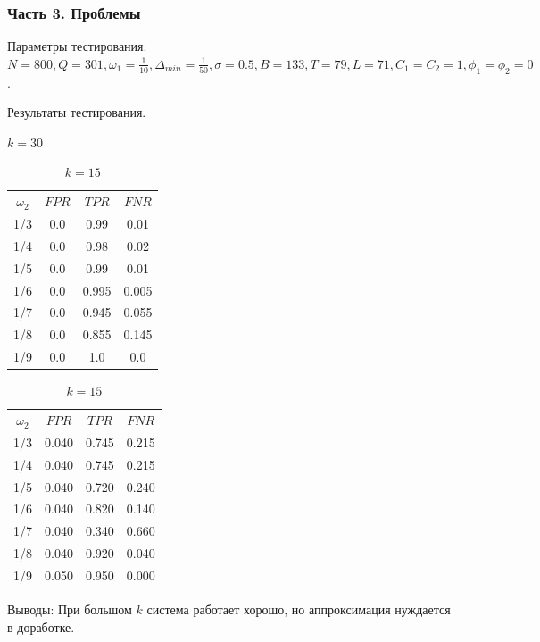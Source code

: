 \documentclass[pdf, 9pt,intlimits, unicode]{beamer}
\begin{document}
	\begin{frame}
		\frametitle{Часть 3. Проблемы}
		{\color{blue} Параметры тестирования:} $ N = 800, Q=301, \omega_1=\frac{1}{10} , \Delta_{min}=\frac{1}{50}, \sigma=0.5, B=133, T=79, L=71, C_1=C_2=1, \phi_1=\phi_2=0$.
		
		\bigskip
		
		\begin{table}[!hhh]
			\center
			\caption{Результаты тестирования.}
			\begin{minipage}{.5\linewidth}
				\caption{$ k=30 $}
				\centering
				\begin{tabular}{cccc}
					\toprule
					$ \omega_2 $ & $ FPR $ &    $ TPR $ &    $ FNR $ \\
					1/3 &  0.0 &   0.99 &   0.01 \\
					1/4 &  0.0 &   0.98 &   0.02 \\
					1/5 &  0.0 &   0.99 &   0.01 \\
					1/6 &  0.0 &  0.995 &  0.005 \\				
					1/7 &  0.0 &  0.945 &  0.055 \\
					1/8 &  0.0 &  0.855 &  0.145 \\
					1/9 &  0.0 &    1.0 &    0.0 \\
					\bottomrule
				\end{tabular}
			\end{minipage}%
			\begin{minipage}{.5\linewidth}
				\caption{$ k=15 $}
				\centering
				\begin{tabular}{cccc}
					\toprule
					$ \omega_2 $ & $ FPR $ &    $ TPR $ &    $ FNR $ \\
					1/3 &  0.040 & 0.745 & 0.215  \\
					1/4 &  0.040 & 0.745 & 0.215 \\
					1/5 &  0.040 & 0.720 & 0.240 \\
					1/6 &  0.040 & 0.820 & 0.140 \\				
					1/7 &  0.040 & 0.340 & 0.660 \\
					1/8 &  0.040 & 0.920 & 0.040  \\
					1/9 &  0.050 & 0.950 & 0.000  \\
					\bottomrule
				\end{tabular}
			\end{minipage}%
		\end{table}
	
	
		\bigskip
		
		{\color{blue} Выводы:} При большом $ k $ система работает хорошо, но аппроксимация нуждается в доработке.
	
	\end{frame}	
	
\end{document}
